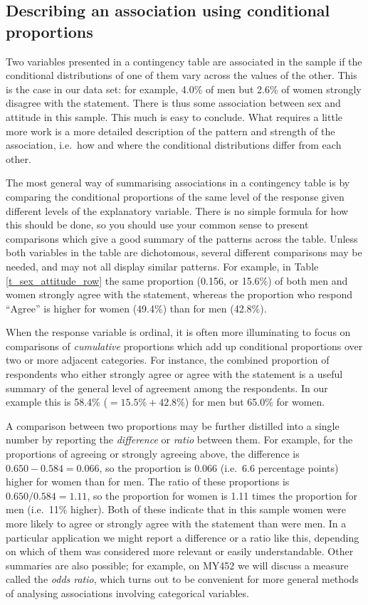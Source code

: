 \subsection{Describing an association using conditional proportions}
\label{ss_descr1_2cat_descr}

Two variables presented in a contingency table are associated in the
sample if the conditional distributions of one of them vary across the
values of the other. This is the case in our data set: for example,
4.0\% of men but 2.6\% of women strongly disagree with the statement. There
is thus some association between sex and attitude in this sample. This
much is easy to conclude. What requires a little more work is a more
detailed description of the pattern and strength of the association,
i.e.\ how and where the conditional distributions differ from each
other.

The most general way of summarising associations in a contingency
table is by comparing the conditional proportions of the same level of
the response given different levels of the explanatory variable. There
is no simple formula for how this should be done, so you should use your
common sense to present comparisons which give a good summary of the
patterns across the table. Unless both variables in the table are
dichotomous, several different comparisons may be needed, and may not
all display similar patterns. For example, in Table
\ref{t_sex_attitude_row} the same proportion (0.156, or 15.6\%) of both men and
women strongly agree with the statement, whereas the proportion who
respond ``Agree'' is higher for women (49.4\%) than for men (42.8\%).

When the response variable is ordinal, it is often more illuminating to
focus on comparisons of \emph{cumulative} proportions which add up
conditional proportions over two or more adjacent categories. For
instance, the combined proportion of respondents who either strongly
agree or agree with the statement is a useful summary of the general
level of agreement among the respondents. In our example this is 58.4\%
($=15.5\%+42.8\%$) for men but 65.0\% for women.

A comparison between two proportions may be further distilled into a
single number by
reporting the \emph{difference} or \emph{ratio} between them. For
example, for the proportions of agreeing or strongly agreeing above, the
difference is $0.650-0.584=0.066$, so the proportion is 0.066 (i.e.\ 6.6
percentage points) higher for women than for men. The ratio of these
proportions is $0.650/0.584=1.11$, so the proportion for women is 1.11
times the proportion for men (i.e.\ 11\% higher). Both of these indicate
that in this sample women were more likely to agree or strongly agree
with the statement than were men. In a particular application we might
report a difference or a ratio like this, depending on which of them was
considered more relevant or easily understandable. Other summaries are
also possible; for example, on MY452 we will discuss a measure called
the \emph{odds ratio}, which turns out to be convenient for more general
methods of analysing associations involving categorical variables.

